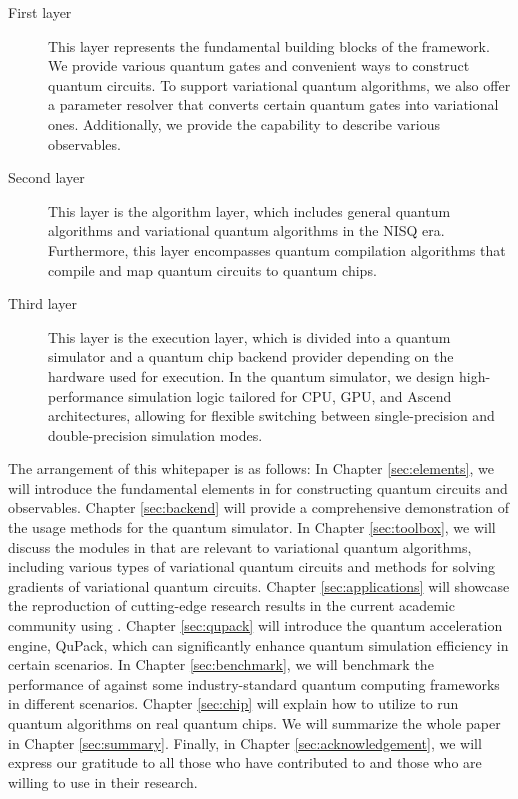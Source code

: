 \begin{description}
    \item[First layer] This layer represents the fundamental building blocks of the framework. We provide various quantum gates and convenient ways to construct quantum circuits. To support variational quantum algorithms, we also offer a parameter resolver that converts certain quantum gates into variational ones. Additionally, we provide the capability to describe various observables.
    \item[Second layer] This layer is the algorithm layer, which includes general quantum algorithms and variational quantum algorithms in the NISQ era. Furthermore, this layer encompasses quantum compilation algorithms that compile and map quantum circuits to quantum chips.
    \item[Third layer] This layer is the execution layer, which is divided into a quantum simulator and a quantum chip backend provider depending on the hardware used for execution. In the quantum simulator, we design high-performance simulation logic tailored for CPU, GPU, and Ascend architectures, allowing for flexible switching between single-precision and double-precision simulation modes.
\end{description}

The arrangement of this whitepaper is as follows: In Chapter \hyperref[sec:elements]{\ref*{sec:elements}}, we will introduce the fundamental elements in \MindQuantum for constructing quantum circuits and observables. Chapter \hyperref[sec:backend]{\ref*{sec:backend}} will provide a comprehensive demonstration of the usage methods for the quantum simulator. In Chapter \hyperref[sec:toolbox]{\ref*{sec:toolbox}}, we will discuss the modules in \MindQuantum that are relevant to variational quantum algorithms, including various types of variational quantum circuits and methods for solving gradients of variational quantum circuits. Chapter \hyperref[sec:applications]{\ref*{sec:applications}} will showcase the reproduction of cutting-edge research results in the current academic community using \MindQuantum. Chapter \hyperref[sec:qupack]{\ref*{sec:qupack}} will introduce the quantum acceleration engine, QuPack, which can significantly enhance quantum simulation efficiency in certain scenarios. In Chapter \hyperref[sec:benchmark]{\ref*{sec:benchmark}}, we will benchmark the performance of \MindQuantum against some industry-standard quantum computing frameworks in different scenarios. Chapter \hyperref[sec:chip]{\ref*{sec:chip}} will explain how to utilize \MindQuantum to run quantum algorithms on real quantum chips. We will summarize the whole paper in Chapter \hyperref[sec:summary]{\ref*{sec:summary}}. Finally, in Chapter \hyperref[sec:acknowledgement]{\ref*{sec:acknowledgement}}, we will express our gratitude to all those who have contributed to \MindQuantum and those who are willing to use \MindQuantum in their research.

